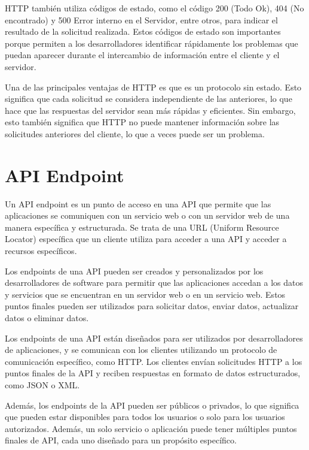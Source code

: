 HTTP también utiliza códigos de estado, como el código 200 (Todo Ok), 404 (No encontrado) y 500 Error interno en el Servidor, entre otros, para indicar el resultado de la solicitud realizada. Estos códigos de estado son importantes porque permiten a los desarrolladores identificar rápidamente los problemas que puedan aparecer durante el intercambio de información entre el cliente y el servidor.

Una de las principales ventajas de HTTP es que es un protocolo sin estado. Esto significa que cada solicitud se considera independiente de las anteriores, lo que hace que las respuestas del servidor sean más rápidas y eficientes. Sin embargo, esto también significa que HTTP no puede mantener información sobre las solicitudes anteriores del cliente, lo que a veces puede ser un problema.

\section{API Endpoint}

Un API endpoint \cite{endpoint} es un punto de acceso en una API que permite que las aplicaciones se comuniquen con un servicio web o con un servidor web de una manera específica y estructurada. Se trata de una URL (Uniform Resource Locator) específica que un cliente utiliza para acceder a una API y acceder a recursos específicos.

Los endpoints de una API pueden ser creados y personalizados por los desarrolladores de software para permitir que las aplicaciones accedan a los datos y servicios que se encuentran en un servidor web o en un servicio web. Estos puntos finales pueden ser utilizados para solicitar datos, enviar datos, actualizar datos o eliminar datos.

Los endpoints de una API están diseñados para ser utilizados por desarrolladores de aplicaciones, y se comunican con los clientes utilizando un protocolo de comunicación específico, como HTTP. Los clientes envían solicitudes HTTP a los puntos finales de la API y reciben respuestas en formato de datos estructurados, como JSON  o XML.

Además, los endpoints de la API pueden ser públicos o privados, lo que significa que pueden estar disponibles para todos los usuarios o solo para los usuarios autorizados. Además, un solo servicio o aplicación puede tener múltiples puntos finales de API, cada uno diseñado para un propósito específico.





